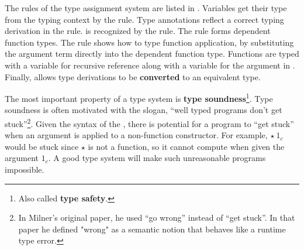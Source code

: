 The rules of the type assignment system are listed in .
Variables get their type from the typing context by the  rule.
Type annotations reflect a correct typing derivation in the  rule.
\Tit{} is recognized by the  rule.
The  rule forms dependent function types.
The  rule shows how to type function application, by substituting the argument term directly into the dependent function type.
Functions are typed with a variable for recursive reference along with a variable for the argument in .
Finally,  allows type derivations to be \textbf{converted} to an equivalent type.
 
The most important property of a type system is \textbf{type soundness}\footnote{
  Also called \textbf{type safety}.
}.
Type soundness is often motivated with the slogan, ``well typed programs don't get stuck''\cite{MILNER1978348}\footnote{
  In Milner's original paper, he used ``go wrong'' instead of ``get stuck''.
  In that paper he defined "wrong" as a semantic notion that behaves like a runtime type error.
}.
Given the syntax of the \slang{}, there is potential for a program to ``get stuck'' when an argument is applied to a non-function constructor.
For example, $\star\ 1_{c}$ would be stuck since $\star$ is not a function, so it cannot compute when given the argument $1_{c}$.
A good type system will make such unreasonable programs impossible.
 
